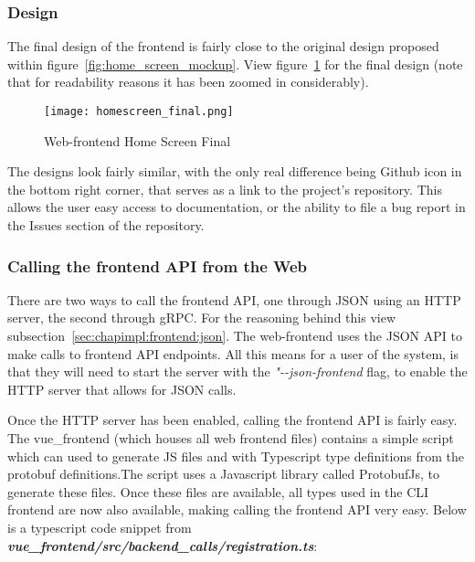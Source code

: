 \subsubsection{Design}
The final design of the frontend is fairly close to the original design proposed within figure~\ref{fig:home_screen_mockup}. View figure~\ref{fig:home_screen_final} for the final design (note that for readability reasons it has been zoomed in considerably).

\begin{figure}[h]
\caption{Web-frontend Home Screen Final}
\texttt{[image: homescreen\_final.png]}
\label{fig:home_screen_final}
\end{figure}

The designs look fairly similar, with the only real difference being Github icon in the bottom right corner, that serves as a link to the project's repository. This allows the user easy access to documentation, or the ability to file a bug report in the Issues section of the repository.

\subsubsection{Calling the frontend API from the Web}
There are two ways to call the frontend API, one through JSON using an HTTP server, the second through gRPC. For the reasoning behind this view subsection~\ref{sec:chapimpl:frontend:json}. The web-frontend uses the JSON API to make calls to frontend API endpoints. All this means for a user of the system, is that they will need to start the server with the \textit{"-{}-json-frontend} flag, to enable the HTTP server that allows for JSON calls.

Once the HTTP server has been enabled, calling the frontend API is fairly easy. The vue\_frontend (which houses all web frontend files) contains a simple script which can used to generate JS files and with Typescript type definitions from the protobuf definitions.The script uses a Javascript library called ProtobufJs, to generate these files. Once these files are available, all types used in the CLI frontend are now also available, making calling the frontend API very easy. Below is a typescript code snippet from \textit{\textbf{vue\_frontend/src/backend\_calls/registration.ts}}:

